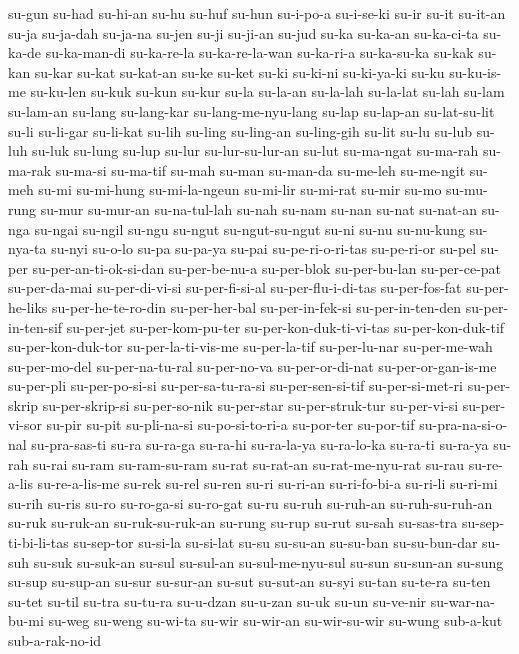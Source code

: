 {su-gun su-had su-hi-an su-hu su-huf su-hun su-i-po-a su-i-se-ki su-ir
su-it su-it-an su-ja su-ja-dah su-ja-na su-jen su-ji su-ji-an su-jud su-ka
su-ka-an su-ka-ci-ta su-ka-de su-ka-man-di su-ka-re-la su-ka-re-la-wan
su-ka-ri-a su-ka-su-ka su-kak su-kan su-kar su-kat su-kat-an su-ke su-ket
su-ki su-ki-ni su-ki-ya-ki su-ku su-ku-is-me su-ku-len su-kuk su-kun
su-kur su-la su-la-an su-la-lah su-la-lat su-lah su-lam su-lam-an su-lang
su-lang-kar su-lang-me-nyu-lang su-lap su-lap-an su-lat-su-lit su-li
su-li-gar su-li-kat su-lih su-ling su-ling-an su-ling-gih su-lit su-lu
su-lub su-luh su-luk su-lung su-lup su-lur su-lur-su-lur-an su-lut
su-ma-ngat su-ma-rah su-ma-rak su-ma-si su-ma-tif su-mah su-man su-man-da
su-me-leh su-me-ngit su-meh su-mi su-mi-hung su-mi-la-ngeun su-mi-lir
su-mi-rat su-mir su-mo su-mu-rung su-mur su-mur-an su-na-tul-lah su-nah
su-nam su-nan su-nat su-nat-an su-nga su-ngai su-ngil su-ngu su-ngut
su-ngut-su-ngut su-ni su-nu su-nu-kung su-nya-ta su-nyi su-o-lo su-pa
su-pa-ya su-pai su-pe-ri-o-ri-tas su-pe-ri-or su-pel su-per
su-per-an-ti-ok-si-dan su-per-be-nu-a su-per-blok su-per-bu-lan
su-per-ce-pat su-per-da-mai su-per-di-vi-si su-per-fi-si-al
su-per-flu-i-di-tas su-per-fos-fat su-per-he-liks su-per-he-te-ro-din
su-per-her-bal su-per-in-fek-si su-per-in-ten-den su-per-in-ten-sif
su-per-jet su-per-kom-pu-ter su-per-kon-duk-ti-vi-tas su-per-kon-duk-tif
su-per-kon-duk-tor su-per-la-ti-vis-me su-per-la-tif su-per-lu-nar
su-per-me-wah su-per-mo-del su-per-na-tu-ral su-per-no-va su-per-or-di-nat
su-per-or-gan-is-me su-per-pli su-per-po-si-si su-per-sa-tu-ra-si
su-per-sen-si-tif su-per-si-met-ri su-per-skrip su-per-skrip-si
su-per-so-nik su-per-star su-per-struk-tur su-per-vi-si su-per-vi-sor
su-pir su-pit su-pli-na-si su-po-si-to-ri-a su-por-ter su-por-tif
su-pra-na-si-o-nal su-pra-sas-ti su-ra su-ra-ga su-ra-hi su-ra-la-ya
su-ra-lo-ka su-ra-ti su-ra-ya su-rah su-rai su-ram su-ram-su-ram su-rat
su-rat-an su-rat-me-nyu-rat su-rau su-re-a-lis su-re-a-lis-me su-rek
su-rel su-ren su-ri su-ri-an su-ri-fo-bi-a su-ri-li su-ri-mi su-rih su-ris
su-ro su-ro-ga-si su-ro-gat su-ru su-ruh su-ruh-an su-ruh-su-ruh-an su-ruk
su-ruk-an su-ruk-su-ruk-an su-rung su-rup su-rut su-sah su-sas-tra
su-sep-ti-bi-li-tas su-sep-tor su-si-la su-si-lat su-su su-su-an su-su-ban
su-su-bun-dar su-suh su-suk su-suk-an su-sul su-sul-an su-sul-me-nyu-sul
su-sun su-sun-an su-sung su-sup su-sup-an su-sur su-sur-an su-sut
su-sut-an su-syi su-tan su-te-ra su-ten su-tet su-til su-tra su-tu-ra
su-u-dzan su-u-zan su-uk su-un su-ve-nir su-war-na-bu-mi su-weg su-weng
su-wi-ta su-wir su-wir-an su-wir-su-wir su-wung sub-a-kut sub-a-rak-no-id
}
